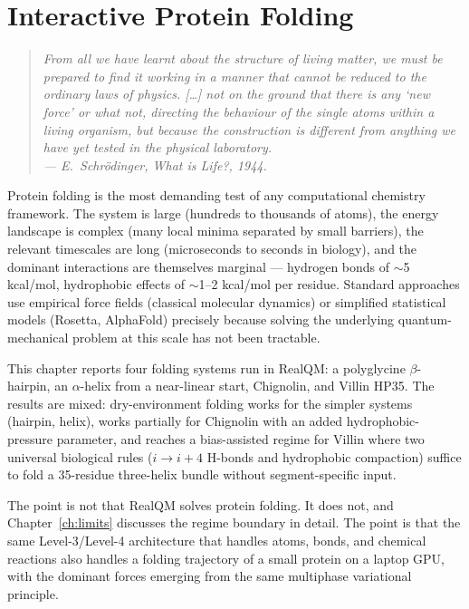 \chapter{Interactive Protein Folding}\label{ch:folding}

\begin{quote}
\itshape From all we have learnt about the structure of living matter, we must be prepared to find it working in a manner that cannot be reduced to the ordinary laws of physics. [\ldots] not on the ground that there is any `new force' or what not, directing the behaviour of the single atoms within a living organism, but because the construction is different from anything we have yet tested in the physical laboratory.\\
\normalfont\hfill --- E.~Schr\"odinger, \emph{What is Life?}, 1944.
\end{quote}
\bigskip

Protein folding is the most demanding test of any computational chemistry framework. The system is large (hundreds to thousands of atoms), the energy landscape is complex (many local minima separated by small barriers), the relevant timescales are long (microseconds to seconds in biology), and the dominant interactions are themselves marginal --- hydrogen bonds of $\sim$5 kcal/mol, hydrophobic effects of $\sim$1--2 kcal/mol per residue. Standard approaches use empirical force fields (classical molecular dynamics) or simplified statistical models (Rosetta, AlphaFold) precisely because solving the underlying quantum-mechanical problem at this scale has not been tractable.

This chapter reports four folding systems run in RealQM: a polyglycine $\beta$-hairpin, an $\alpha$-helix from a near-linear start, Chignolin, and Villin HP35. The results are mixed: dry-environment folding works for the simpler systems (hairpin, helix), works partially for Chignolin with an added hydrophobic-pressure parameter, and reaches a bias-assisted regime for Villin where two universal biological rules ($i \to i{+}4$ H-bonds and hydrophobic compaction) suffice to fold a 35-residue three-helix bundle without segment-specific input.

The point is not that RealQM solves protein folding. It does not, and Chapter~\ref{ch:limits} discusses the regime boundary in detail. The point is that the same Level-3/Level-4 architecture that handles atoms, bonds, and chemical reactions also handles a folding trajectory of a small protein on a laptop GPU, with the dominant forces emerging from the same multiphase variational principle.

